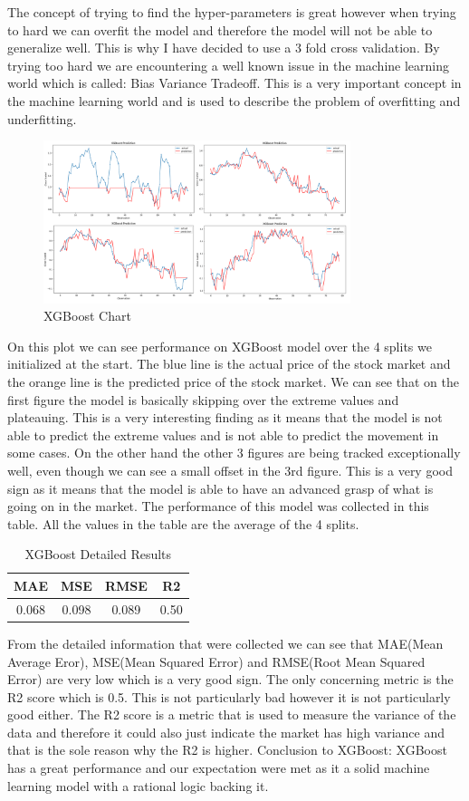 \documentclass{imc-inf}
\begin{document}
	The concept of trying to find the hyper-parameters is great however when trying to hard we can overfit the model and therefore the model will not be able to generalize well. This is why I have decided to use a 3 fold cross validation.
	By trying too hard we are encountering a well known issue in the machine learning world which is called: Bias Variance Tradeoff. This is a very important concept in the machine learning world and is used to describe the problem of overfitting
	and underfitting. 
	\begin{figure}[h]
		\centering
		\includegraphics[width=0.8\textwidth]{xgboost_chart.png}
		\caption{XGBoost Chart}
		\label{fig:xgboost_chart}
	\end{figure}
	On this plot we can see performance on XGBoost model over the 4 splits we initialized at the start. The blue line is the actual price of the stock market and the orange line is the predicted price of the stock market.
	We can see that on the first figure the model is basically skipping over the extreme values and plateauing. This is a very interesting finding as it means that the model is not able to predict the extreme values and is not able to predict the 
	movement in some cases. On the other hand the other 3 figures are being tracked exceptionally well, even though we can see a small offset in the 3rd figure. This is a very good sign as it means that the model is able to have an 
	advanced grasp of what is going on in the market. The performance of this model was collected in this table. All the values in the table are the average of the 4 splits.
	\begin{table}[h]
		\centering
		\begin{tabular}{|c|c|c|c|}
			\hline
			\textbf{MAE} & \textbf{MSE} & \textbf{RMSE} & \textbf{R2} \\ \hline
			0.068 & 0.098 & 0.089 & 0.50 \\ \hline
		\end{tabular}
		\caption{XGBoost Detailed Results}
		\label{tab:xgboost_detailed_results}
	\end{table}
	From the detailed information that were collected we can see that MAE(Mean Average Eror), MSE(Mean Squared Error) and RMSE(Root Mean Squared Error) are very low which is a very good sign. The only concerning metric is the R2 score which is 0.5.
	This is not particularly bad however it is not particularly good either. The R2 score is a metric that is used to measure the variance of the data and therefore it could also just indicate the market has high variance and that is the 
	sole reason why the R2 is higher. Conclusion to XGBoost: XGBoost has a great performance and our expectation were met as it a solid machine learning model with a rational logic backing it.
\end{document}
